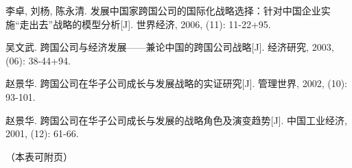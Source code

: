 \documentclass[UTF8, a4paper, 11pt]{ctexart}
\begin{document}
\begin{UnifiedBox}[height=25.4cm]
\begin{enumerate}[label={[}\arabic*{]}, leftmargin=2em, itemsep=0.15em, parsep=0pt]
\item 李卓, 刘杨, 陈永清. 发展中国家跨国公司的国际化战略选择：针对中国企业实施``走出去''战略的模型分析[J]. 世界经济, 2006, (11): 11-22+95.

\item 吴文武. 跨国公司与经济发展——兼论中国的跨国公司战略[J]. 经济研究, 2003, (06): 38-44+94.

\item 赵景华. 跨国公司在华子公司成长与发展战略的实证研究[J]. 管理世界, 2002, (10): 93-101.

\item 赵景华. 跨国公司在华子公司成长与发展的战略角色及演变趋势[J]. 中国工业经济, 2001, (12): 61-66.

\end{enumerate}

\vspace*{\fill}
\begin{flushright} （本表可附页） \end{flushright}
\end{UnifiedBox}
\vfill %
\end{document}
